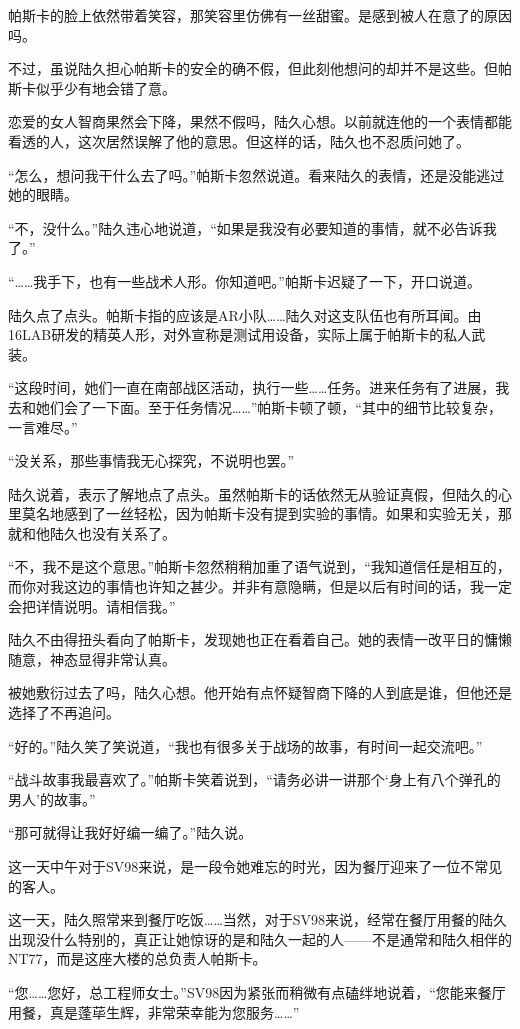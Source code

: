 帕斯卡的脸上依然带着笑容，那笑容里仿佛有一丝甜蜜。是感到被人在意了的原因吗。 

不过，虽说陆久担心帕斯卡的安全的确不假，但此刻他想问的却并不是这些。但帕斯卡似乎少有地会错了意。

恋爱的女人智商果然会下降，果然不假吗，陆久心想。以前就连他的一个表情都能看透的人，这次居然误解了他的意思。但这样的话，陆久也不忍质问她了。

“怎么，想问我干什么去了吗。”帕斯卡忽然说道。看来陆久的表情，还是没能逃过她的眼睛。

“不，没什么。”陆久违心地说道，“如果是我没有必要知道的事情，就不必告诉我了。”

“……我手下，也有一些战术人形。你知道吧。”帕斯卡迟疑了一下，开口说道。

陆久点了点头。帕斯卡指的应该是AR小队……陆久对这支队伍也有所耳闻。由16LAB研发的精英人形，对外宣称是测试用设备，实际上属于帕斯卡的私人武装。

“这段时间，她们一直在南部战区活动，执行一些……任务。进来任务有了进展，我去和她们会了一下面。至于任务情况……”帕斯卡顿了顿，“其中的细节比较复杂，一言难尽。”

“没关系，那些事情我无心探究，不说明也罢。”

陆久说着，表示了解地点了点头。虽然帕斯卡的话依然无从验证真假，但陆久的心里莫名地感到了一丝轻松，因为帕斯卡没有提到实验的事情。如果和实验无关，那就和他陆久也没有关系了。

“不，我不是这个意思。”帕斯卡忽然稍稍加重了语气说到，“我知道信任是相互的，而你对我这边的事情也许知之甚少。并非有意隐瞒，但是以后有时间的话，我一定会把详情说明。请相信我。”

陆久不由得扭头看向了帕斯卡，发现她也正在看着自己。她的表情一改平日的慵懒随意，神态显得非常认真。

被她敷衍过去了吗，陆久心想。他开始有点怀疑智商下降的人到底是谁，但他还是选择了不再追问。

“好的。”陆久笑了笑说道，“我也有很多关于战场的故事，有时间一起交流吧。”

“战斗故事我最喜欢了。”帕斯卡笑着说到，“请务必讲一讲那个‘身上有八个弹孔的男人’的故事。”

“那可就得让我好好编一编了。”陆久说。

这一天中午对于SV98来说，是一段令她难忘的时光，因为餐厅迎来了一位不常见的客人。

这一天，陆久照常来到餐厅吃饭……当然，对于SV98来说，经常在餐厅用餐的陆久出现没什么特别的，真正让她惊讶的是和陆久一起的人——不是通常和陆久相伴的NT77，而是这座大楼的总负责人帕斯卡。

“您……您好，总工程师女士。”SV98因为紧张而稍微有点磕绊地说着，“您能来餐厅用餐，真是蓬荜生辉，非常荣幸能为您服务……”


